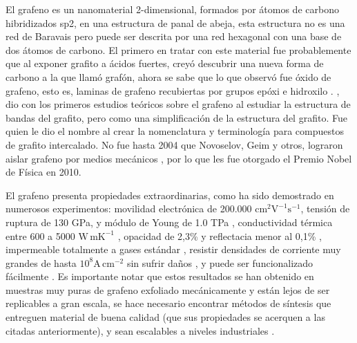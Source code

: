 El grafeno es un nanomaterial 2-dimensional, formados por átomos de carbono  hibridizados sp2, en una estructura de panal de abeja, esta estructura no es una red de Baravais pero puede ser descrita por una red hexagonal con una base de dos átomos de carbono. El primero en tratar con este material fue probablemente \citet{Brodie1859} que al exponer grafito a ácidos fuertes, creyó descubrir una nueva forma de carbono a la que llamó grafón, ahora se sabe que lo que observó fue óxido de grafeno, esto es, laminas de grafeno recubiertas por grupos epóxi e hidroxilo \citep{Geim2012}. \citet{Wallace1947}, dio con los primeros estudios teóricos sobre el grafeno al estudiar la estructura de bandas del grafito, pero como una simplificación de la estructura del grafito. Fue \citet{Boehm1986} quien le dio el nombre al crear la nomenclatura y terminología para compuestos de grafito intercalado. No fue hasta 2004 que Novoselov, Geim y otros, lograron aislar grafeno por medios mecánicos \citep{Novoselov2004}, por lo que les fue otorgado el Premio Nobel de Física en 2010.

El grafeno presenta propiedades extraordinarias, como ha sido demostrado en numerosos experimentos: movilidad electrónica de 200.000 $\mathrm{cm^2 V^{-1} s^{-1} }$\citep{Bolotin2008}, tensión de ruptura de 130 GPa, y módulo de Young de 1.0 TPa \citep{Lee2008}, conductividad térmica entre 600 a 5000 $\mathrm{W\, mK^{-1}}$ \citep{Balandin2011}, opacidad de 2,3\% y reflectacia menor al 0,1\% \citep{Nair2008}, impermeable totalmente a gases estándar \citep{Bunch2007}, resistir densidades de corriente muy grandes de hasta $\mathrm{10^8 A\, cm^{-2}}$ sin sufrir daños  \citep{Moser2007}, y puede ser funcionalizado fácilmente \citep{Loh2010}. Es importante notar que estos resultados se han obtenido en muestras muy puras de grafeno exfoliado mecánicamente \citep{Novoselov2004} y están lejos de ser replicables a gran escala, se hace necesario encontrar métodos de síntesis que entreguen material de buena calidad (que sus propiedades se acerquen a las citadas anteriormente), y sean escalables a niveles industriales \citep{Novoselov2012}.

